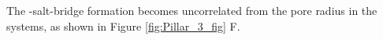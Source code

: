 \documentclass[9pt,twocolumn,twoside,lineno]{pnas-new}
\begin{document}

The \triadns-\fivering salt-bridge formation becomes uncorrelated from the pore radius in the \MT systems, as shown in Figure \ref{fig:Pillar_3_fig} F.  
\end{document}
